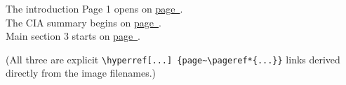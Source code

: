 \documentclass[letterpaper]{article}
\begin{document}
\noindent
The introduction  Page 1 opens on \hyperref[img:iran-cia-intro:page_1]{page~\pageref*{img:iran-cia-intro:page_1}}.\\
The CIA summary  begins on \hyperref[img:iran-cia-summary:page_1]{page~\pageref*{img:iran-cia-summary:page_1}}.\\
Main section 3 starts on \hyperref[img:iran-cia-main.3:page_1]{page~\pageref*{img:iran-cia-main.3:page_1}}.

\bigskip\noindent
(All three are explicit \verb|\hyperref[...] {page~\pageref*{...}}|
links derived directly from the image filenames.)

\clearpage


\end{document}
